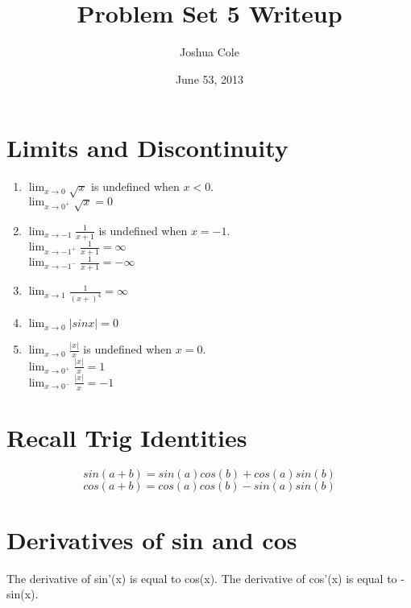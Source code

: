 \documentclass {article}
\begin{document}
\title {Problem Set 5 Writeup}
\author {Joshua Cole}
\date {June 53, 2013}
\maketitle
\section {Limits and Discontinuity}

\begin{enumerate}
\item $\lim_{x \to 0}\sqrt{x}$ is undefined when $x<0$.\\
$\lim_{x \to 0^+}\sqrt{x}=0$

\item $\lim_{x \to -1}\frac{1}{x+1}$ is undefined when $x=-1$.\\
$\lim_{x \to -1^+}\frac{1}{x+1}=\infty$ \\
$\lim_{x \to -1^-}\frac{1}{x+1}=-\infty$ 

\item $\lim_{x \to 1}\frac{1}{(x+)^4}=\infty$

\item $\lim_{x \to 0}|sinx|=0$

\item $\lim_{x \to 0} \frac{|x|}{x}$ is undefined when $x=0$.\\
 $\lim_{x \to 0^+} \frac{|x|}{x}=1$\\
 $\lim_{x \to 0^-} \frac{|x|}{x}=-1$
\end{enumerate}

\section {Recall Trig Identities}

$$sin(a+b) = sin(a)cos(b) + cos(a)sin(b)$$
$$cos(a+b) = cos(a)cos(b) - sin(a)sin(b)$$

\section {Derivatives of sin and cos}

The derivative of sin'(x) is equal to cos(x).
The derivative of cos'(x) is equal to -sin(x).
\end{document}

